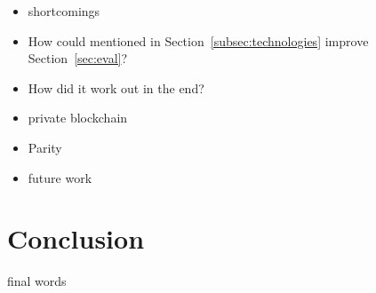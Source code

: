 \documentclass[runningheads]{llncs}
\newcommand{\refsec}[1]{Section~\ref{#1}}
\begin{document}
\begin{itemize}
    \item shortcomings
    \item How could mentioned in \refsec{subsec:technologies} improve \refsec{sec:eval}?
    \item How did it work out in the end? 
    \item private blockchain
    \item Parity
    \item future work
\end{itemize}


\section{Conclusion} \label{sec:conclusion}

final words




\end{document}
